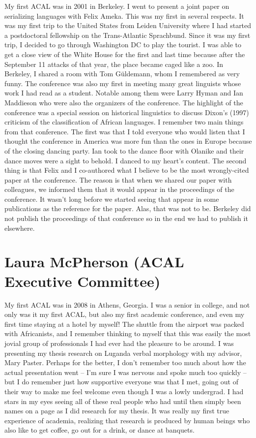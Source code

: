 \documentclass[output=paper]{langscibook}
\begin{document}
My first ACAL was in 2001 in Berkeley. I went to present a joint paper on serializing languages with Felix Ameka. This was my first in several respects. It was my first trip to the United States from Leiden University where I had started a postdoctoral fellowship on the Trans-Atlantic Sprachbund. Since it was my first trip, I decided to go through Washington DC to play the tourist. I was able to get a close view of the White House for the first and last time because after the September 11 attacks of that year, the place became caged like a zoo. In Berkeley, I shared a room with Tom Güldemann, whom I remembered as very funny. The conference was also my first in meeting many great linguists whose work I had read as a student. Notable among them were Larry Hyman and Ian Maddieson who were also the organizers of the conference. The highlight of the conference was a special session on historical linguistics to discuss Dixon’s (1997) criticism of the classification of African languages. I remember two main things from that conference. The first was that I told everyone who would listen that I thought the conference in America was more fun than the ones in Europe because of the closing dancing party. Ian took to the dance floor with Olanike and their dance moves were a sight to behold. I danced to my heart’s content. The second thing is that Felix and I co-authored what I believe to be the most wrongly-cited paper at the conference. The reason is that when we shared our paper with colleagues, we informed them that it would appear in the proceedings of the conference. It wasn’t long before we started seeing that appear in some publications as the reference for the paper. Alas, that was not to be. Berkeley did not publish the proceedings of that conference so in the end we had to publish it elsewhere.

\section*{Laura McPherson (ACAL Executive Committee)}\largerpage

My first ACAL was in 2008 in Athens, Georgia. I was a senior in college, and not only was it my first ACAL, but also my first academic conference, and even my first time staying at a hotel by myself! The shuttle from the airport was packed with Africanists, and I remember thinking to myself that this was easily the most jovial group of professionals I had ever had the pleasure to be around. I was presenting my thesis research on Luganda verbal morphology with my advisor, Mary Paster. Perhaps for the better, I don’t remember too much about how the actual presentation went -- I’m sure I was nervous and spoke much too quickly -- but I do remember just how supportive everyone was that I met, going out of their way to make me feel welcome even though I was a lowly undergrad. I had stars in my eyes seeing all of these real people who had until then simply been names on a page as I did research for my thesis. It was really my first true experience of academia, realizing that research is produced by human beings who also like to get coffee, go out for a drink, or dance at banquets. 
\end{document}

